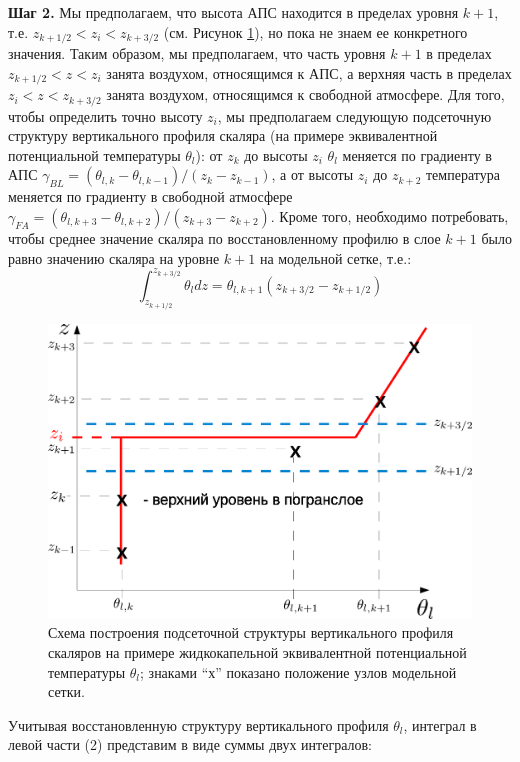 \documentclass[12pt]{article}
\begin{document}
{\bf Шаг 2.} Мы предполагаем, что высота АПС находится в пределах уровня $k+1$, т.е. $z_{k+1/2} < z_i < z_{k+3/2}$ (см. Рисунок \ref{scheme}), но пока не знаем ее конкретного значения. Таким образом, мы предполагаем, что часть уровня $k+1$ в пределах $z_{k+1/2}<z<z_i$ занята воздухом, относящимся к АПС, а верхняя часть в пределах $z_i < z < z_{k+3/2}$ занята воздухом, относящимся к свободной атмосфере. Для того, чтобы определить точно высоту $z_i$, мы предполагаем следующую подсеточную структуру вертикального профиля скаляра (на примере эквивалентной потенциальной температуры $\theta_l$): от $z_k$ до высоты $z_i$ $\theta_l$ меняется по градиенту в АПС $\gamma_{BL} = (\theta_{l,k} - \theta_{l,k-1})/(z_k - z_{k-1})$, а от высоты $z_i$ до $z_{k+2}$ температура меняется по градиенту в свободной атмосфере $\gamma_{FA} = (\theta_{l,k+3} - \theta_{l,k+2})/(z_{k+3} - z_{k+2})$. Кроме того, необходимо потребовать, чтобы среднее значение скаляра по восстановленному профилю в слое $k+1$ было равно значению скаляра на уровне $k+1$ на модельной сетке, т.е.:
\begin{equation}
 \int_{z_{k+1/2}}^{z_{k+3/2}} \theta_l dz = \theta_{l,k+1} (z_{k+3/2}-z_{k+1/2})
\end{equation}

\begin{figure}
\includegraphics[scale=0.4]{reconstruction.eps}
\caption{Схема построения подсеточной структуры вертикального профиля скаляров на примере жидкокапельной эквивалентной потенциальной температуры $\theta_l$; знаками ``х'' показано положение узлов модельной сетки.}
\label{scheme}
\end{figure}

Учитывая восстановленную структуру вертикального профиля $\theta_l$, интеграл в левой части (2) представим в виде суммы двух интегралов:
\end{document}
